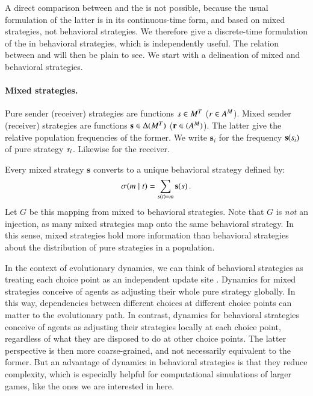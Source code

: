\documentclass[fleqn,reqno,10pt]{article}
\renewcommand{\Smixed}{\ensuremath{\mathrm{\mathbf{s}}}}
\renewcommand{\Rmixed}{\ensuremath{\mathrm{\mathbf{r}}}}
\newcommand{\rmd}{\acro{rmd}} %
\newcommand{\rdd}{\acro{rdd}} %
\begin{document}
A direct comparison between \rdd and the \rmd is not possible, because
the usual formulation of the latter is in its continuous-time form,
and based on mixed strategies, not behavioral strategies. We therefore
give a discrete-time formulation of the \rmd in behavioral strategies,
which is independently useful. The relation between \rdd and \rmd will
then be plain to see. We start with a delineation of mixed and
behavioral strategies.

\paragraph{Mixed strategies.} Pure sender (receiver) strategies are
functions $s \in M^T$ ($r \in
A^M$). Mixed sender (receiver) strategies are functions
$\Smixed \in \Delta(\Messgs^\States)$ ($\Rmixed \in
(\Acts^\Messgs)$). The latter give the relative population frequencies
of the former. We write $\Smixed_i$ for the frequency
$\Smixed(\Spure_i)$ of pure strategy $s_i$. Likewise for the
receiver.

Every mixed strategy $\Smixed$ converts to a unique behavioral strategy defined by:
\begin{align}
  \label{eq:CorrespondenceBehavioralMixed}
  \Sstrat(\messg \probbar \state) = \sum_{\Spure(\state) = \messg} \Smixed(\Spure)\,.
\end{align} 
Let $G$ be this mapping from mixed to behavioral strategies. Note that $G$
is \emph{not} an injection, as many mixed strategies map onto the same
behavioral strategy. In this sense, mixed strategies hold more
information than behavioral strategies about the distribution of pure strategies in a population.

In the context of evolutionary dynamics, we can think of behavioral
strategies as treating each choice point as an independent update site
\citep[e.g.][]{Cressman2003:Evolutionary-Dy,Sandholm2013:Population-Game}. Dynamics
for mixed strategies conceive of agents as adjusting their whole pure
strategy globally. In this way, dependencies between different choices
at different choice points can matter to the evolutionary path. In
contrast, dynamics for behavioral strategies conceive of agents as
adjusting their strategies locally at each choice point, regardless of
what they are disposed to do at other choice points. The latter
perspective is then more coarse-grained, and not necessarily
equivalent to the former. But an advantage of dynamics in behavioral
strategies is that they reduce complexity, which is especially helpful
for computational simulations of larger games, like the ones we are
interested in here.
\end{document}
